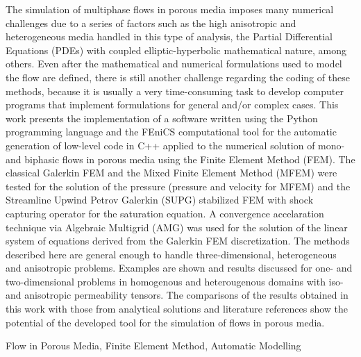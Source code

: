 The simulation of multiphase flows in porous media imposes many numerical challenges due to a series of factors such as the high anisotropic and heterogeneous media handled in this type of analysis, the Partial Differential Equations (PDEs) with coupled elliptic-hyperbolic mathematical nature, among others. Even after the mathematical and numerical formulations used to model the flow are defined, there is still another challenge regarding the coding of these methods, because it is usually a very time-consuming task to develop computer programs that implement formulations for general and/or complex cases. This work presents the implementation of a software written using the Python programming language and the FEniCS computational tool for the automatic generation of low-level code in C++ applied to the numerical solution of mono- and biphasic flows in porous media using the Finite Element Method (FEM). The classical Galerkin FEM and the Mixed Finite Element Method (MFEM) were tested for the solution of the pressure (pressure and velocity for MFEM) and the Streamline Upwind Petrov Galerkin (SUPG) stabilized FEM with shock capturing operator for the saturation equation. A convergence accelaration technique via Algebraic Multigrid (AMG) was used for the solution of the linear system of equations derived from the Galerkin FEM discretization. The methods described here are general enough to handle three-dimensional, heterogeneous and anisotropic problems. Examples are shown and results discussed for one- and two-dimensional problems in homogenous and heterougenous domains with iso- and anisotropic permeability tensors. The comparisons of the results obtained in this work with those from analytical solutions and literature references show the potential of the developed tool for the simulation of flows in porous media.

\begin{keywords}
Flow in Porous Media, Finite Element Method, Automatic Modelling
\end{keywords}
